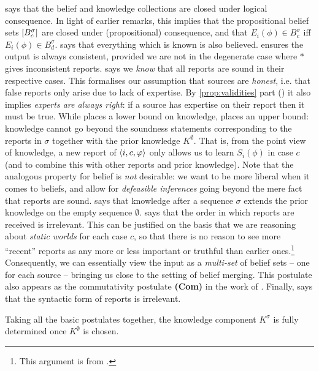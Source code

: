 \closure{} says that the belief and knowledge collections are closed under
logical consequence. In light of earlier remarks,
this implies that the propositional belief sets $\left[{B^\sigma_c}\right]$ are
closed under (propositional) consequence, and that $E_i(\phi) \in B^\sigma_c$
iff $E_i(\phi) \in B^\sigma_d$.
%
\containment{} says that everything which is known is also believed.
%
\consistency{} ensures the output is always consistent, provided
we are not in the degenerate case where $\ast$ gives inconsistent reports.
%
\soundness{} says we \emph{know} that all reports are sound in their respective
cases. This formalises our assumption that sources are \emph{honest}, i.e. that
false reports only arise due to lack of expertise. By \cref{prop:validities}
part () it also implies \emph{experts are
always right}: if a source has expertise on their report then it must be true.
%
While \soundness{} places a lower bound on knowledge, \kbound{} places an upper
bound: knowledge cannot go beyond the soundness statements corresponding to the
reports in $\sigma$ together with the prior knowledge $K^\emptyset$. That is,
from the point view of knowledge, a new report of $\langle {i, c, \varphi} \rangle$ only
allows us to learn $S_i(\phi)$ in case $c$ (and to combine this with other
reports and prior knowledge). Note that the analogous property for belief is
\emph{not} desirable: we want to be more liberal when it comes to beliefs, and
allow for \emph{defeasible inferences} going beyond the mere fact that reports
are sound.
%
\priorext{} says that knowledge after a sequence $\sigma$ extends the prior
knowledge on the empty sequence $\emptyset$.
%
\rearr{} says that the order in which reports are received is irrelevant. This
can be justified on the basis that we are reasoning about \emph{static worlds}
for each case $c$, so that there is no reason
to see more ``recent'' reports as any more or less important or truthful than
earlier ones.\footnote{This argument is from \cite{delgrande2006iterated}.}
Consequently, we can essentially view the input as a \emph{multi-set} of belief
sets -- one for each source -- bringing us close to the setting of belief
merging. This postulate also appears as the commutativity postulate
\textbf{(Com)} in the work of \textcite{schwind2020}.
%
Finally, \equivpost{} says that the syntactic form of reports is irrelevant.

Taking all the basic postulates together, the knowledge component $K^\sigma$ is
fully determined once $K^\emptyset$ is chosen.

